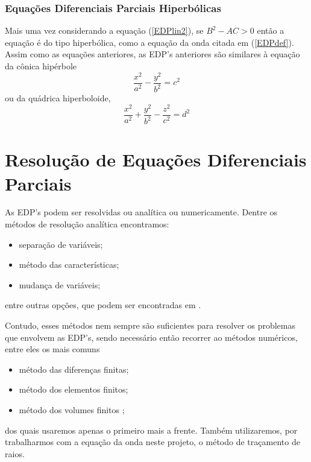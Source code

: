                 \subsubsection{Equações Diferenciais Parciais Hiperbólicas}
        
                    Mais uma vez considerando a equação (\ref{EDPlin2}), se $B^2 - AC > 0$ então a equação é do tipo hiperbólica, como a equação da onda citada em (\ref{EDPdef}). Assim como as equações anteriores, as EDP's anteriores são similares à equação da cônica hipérbole
                    \begin{equation}
                        \frac{x^2}{a^2} - \frac{y^2}{b^2} = c^2
                    \end{equation}
                    ou da quádrica hiperboloide,
                    \begin{equation*}
                        \frac{x^2}{a^2} + \frac{y^2}{b^2} - \frac{z^2}{c^2} = d^2
                    \end{equation*}
        
    \section{Resolução de Equações Diferenciais Parciais}
        
        As EDP's podem ser resolvidas ou analítica ou 
        numericamente. Dentre os métodos de resolução analítica encontramos:
        \begin{itemize}
            \item separação de variáveis;
            \item método das características;
            \item mudança de variáveis;
        \end{itemize}
        entre outras opções, que podem ser encontradas em \cite{wiki:EDP}.
        
        Contudo, esses métodos nem sempre são suficientes para resolver os problemas 
        que envolvem as EDP's, sendo necessário então recorrer ao métodos numéricos, entre eles os mais comuns
        \begin{itemize}
            \item método das diferenças finitas;
            \item método dos elementos finitos;
            \item método dos volumes finitos \cite{wiki:EDP};
        \end{itemize}
        dos quais usaremos apenas o primeiro mais a frente. Também utilizaremos, por 
        trabalharmos com a equação da onda neste projeto, o método de traçamento de raios.
    
